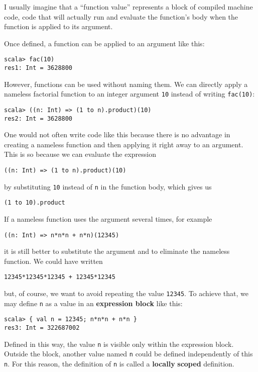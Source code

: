 I usually imagine that a ``function value'' represents a block\emph{
}of compiled machine code,  \textendash{}  code that will actually
run and evaluate the function's body when the function is applied
to its argument.

Once defined, a function can be applied to an argument like this:
\begin{lstlisting}
scala> fac(10)
res1: Int = 3628800
\end{lstlisting}

However, functions can be used without naming them. We can directly
apply a nameless factorial function to an integer argument \lstinline!10!
instead of writing \lstinline!fac(10)!:
\begin{lstlisting}
scala> ((n: Int) => (1 to n).product)(10)
res2: Int = 3628800
\end{lstlisting}
One would not often write code like this because there is no advantage
in creating a nameless function and then applying it right away to
an argument. This is so because we can evaluate the expression
\begin{lstlisting}
((n: Int) => (1 to n).product)(10)
\end{lstlisting}
by substituting \lstinline!10! instead of \lstinline!n! in the function
body, which gives us
\begin{lstlisting}
(1 to 10).product
\end{lstlisting}

If a nameless function uses the argument several times, for example
\begin{lstlisting}
((n: Int) => n*n*n + n*n)(12345)
\end{lstlisting}
it is still better to substitute the argument and to eliminate the
nameless function. We could have written
\begin{lstlisting}
12345*12345*12345 + 12345*12345
\end{lstlisting}
but, of course, we want to avoid repeating the value \lstinline!12345!.
To achieve that, we may define \texttt{}\lstinline!n! as a value
in an \textbf{expression block} like this:
\begin{lstlisting}
scala> { val n = 12345; n*n*n + n*n }
res3: Int = 322687002
\end{lstlisting}
Defined in this way, the value \lstinline!n! is visible only within
the expression block. Outside the block, another value named \lstinline!n!
could be defined independently of this \lstinline!n!. For this reason,
the definition of \lstinline!n! is called a \textbf{locally}
\textbf{scoped} definition.

